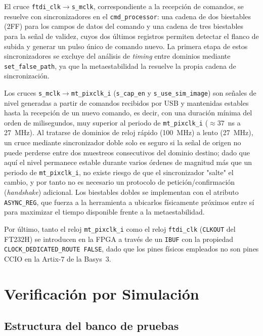 \documentclass[../main.tex]{subfiles}
\begin{document}
El cruce \texttt{ftdi\_clk}$\rightarrow$\texttt{s\_mclk}, correspondiente a la recepción de comandos, se resuelve con sincronizadores en el \texttt{cmd\_processor}: una cadena de dos biestables (2FF) para los campos de datos del comando y una cadena de tres biestables para la señal de validez, cuyos dos últimos registros permiten detectar el flanco de subida y generar un pulso único de comando nuevo. La primera etapa de estos sincronizadores se excluye del análisis de \textit{timing} entre dominios mediante \texttt{set\_false\_path}, ya que la metaestabilidad la resuelve la propia cadena de sincronización.

Los cruces \texttt{s\_mclk}$\rightarrow$\texttt{mt\_pixclk\_i} (\texttt{s\_cap\_en} y \texttt{s\_use\_sim\_image}) son señales de nivel generadas a partir de comandos recibidos por USB y mantenidas estables hasta la recepción de un nuevo comando, es decir, con una duración mínima del orden de milisegundos, muy superior al periodo de \texttt{mt\_pixclk\_i} (${\approx}37$~ns a 27~MHz). Al tratarse de dominios de reloj rápido (100~MHz) a lento (27~MHz), un cruce mediante sincronizador doble solo es seguro si la señal de origen no puede perderse entre dos muestreos consecutivos del dominio destino; dado que aquí el nivel permanece estable durante varios órdenes de magnitud más que un periodo de \texttt{mt\_pixclk\_i}, no existe riesgo de que el sincronizador "salte" el cambio, y por tanto no es necesario un protocolo de petición/confirmación (\textit{handshake}) adicional. Los biestables dobles se implementan con el atributo \texttt{ASYNC\_REG}, que fuerza a la herramienta a ubicarlos físicamente próximos entre sí para maximizar el tiempo disponible frente a la metaestabilidad.

Por último, tanto el reloj \texttt{mt\_pixclk\_i} como el reloj \texttt{ftdi\_clk} (\texttt{CLKOUT} del FT232H) se introducen en la \ac{FPGA} a través de un \texttt{IBUF} con la propiedad \texttt{CLOCK\_DEDICATED\_ROUTE FALSE}, dado que los pines físicos empleados no son pines \ac{CCIO} en la Artix-7 de la Basys~3.


\section{Verificación por Simulación}
\label{sec:verificacion}

\subsection{Estructura del banco de pruebas}
\end{document}
